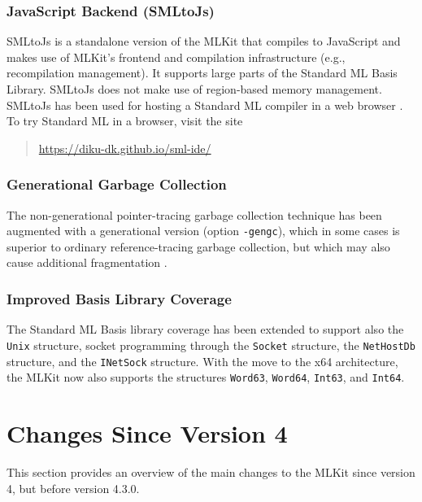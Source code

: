 \documentclass[12pt]{book}
\begin{document}
\subsubsection*{JavaScript Backend (SMLtoJs)}
%

SMLtoJs is a standalone version of the MLKit that compiles to
JavaScript and makes use of MLKit's frontend and compilation
infrastructure (e.g., recompilation management). It supports large
parts of the Standard ML Basis Library. SMLtoJs does not make use of
region-based memory management. SMLtoJs has been used for hosting a
Standard ML compiler in a web browser
\cite{10.1145/2093328.2093336}. To try Standard ML in a browser, visit
the site

\begin{quote}
\url{https://diku-dk.github.io/sml-ide/}
\end{quote}

\subsubsection*{Generational Garbage Collection}
%

The non-generational pointer-tracing garbage collection technique has
been augmented with a generational version (option \texttt{-gengc}),
which in some cases is superior to ordinary reference-tracing garbage
collection, but which may also cause additional fragmentation
\cite{elshaljfp21}.

\subsubsection*{Improved Basis Library Coverage}

The Standard ML Basis library coverage has been extended to support
also the \texttt{Unix} structure, socket programming through the
%
%
%
\texttt{Socket} structure, the \texttt{NetHostDb} structure, and the
\texttt{INetSock} structure. With the move to the x64 architecture,
the MLKit now also supports the structures \texttt{Word63},
\texttt{Word64}, \texttt{Int63}, and \texttt{Int64}.


\section{Changes Since Version 4}
%
This section provides an overview of the main changes to the MLKit
since version 4, but before version 4.3.0.
\end{document}
